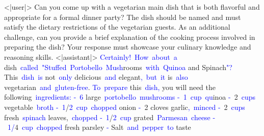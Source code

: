 \documentclass{article}
\begin{document}
\begin{tcolorbox}[colframe=black,colback=white]
<|user|>
Can you come up with a vegetarian main dish that is both flavorful and appropriate for a formal dinner party? The dish should be named and must satisfy the dietary restrictions of the vegetarian guests. As an additional challenge, can you provide a brief explanation of the cooking process involved in preparing the dish? Your response must showcase your culinary knowledge and reasoning skills.
<|assistant|>
\textcolor{blue}{Certainly}\textcolor{blue}{!}\textcolor{blue}{~How}\textcolor{blue}{~about}\textcolor{blue}{~a} dish\textcolor{blue}{~called}\textcolor{blue}{~"}\textcolor{blue}{St}\textcolor{blue}{uffed}\textcolor{blue}{~Port}\textcolor{blue}{ob}\textcolor{blue}{ello}\textcolor{blue}{~Mush}rooms\textcolor{blue}{~with}\textcolor{blue}{~Qu}\textcolor{blue}{inoa} and Spinach\textcolor{blue}{"?} This\textcolor{blue}{~dish}\textcolor{blue}{~is} not\textcolor{blue}{~only} delicious\textcolor{blue}{~and} elegant\textcolor{blue}{,}\textcolor{blue}{~but}\textcolor{blue}{~it} is\textcolor{blue}{~also} vegetarian\textcolor{blue}{~and}\textcolor{blue}{~gluten}\textcolor{blue}{-free}.
\textcolor{blue}{To}\textcolor{blue}{~prepare} this\textcolor{blue}{~dish}\textcolor{blue}{,} you will need the following\textcolor{blue}{~ingredients}\textcolor{blue}{:
}\textcolor{blue}{-}\textcolor{blue}{~}\textcolor{blue}{6} large\textcolor{blue}{~port}\textcolor{blue}{ob}\textcolor{blue}{ello}\textcolor{blue}{~mushrooms}\textcolor{blue}{
}\textcolor{blue}{-}\textcolor{blue}{~}\textcolor{blue}{1}\textcolor{blue}{~cup}\textcolor{blue}{~qu}inoa\textcolor{blue}{
}\textcolor{blue}{-}\textcolor{blue}{~}2\textcolor{blue}{~cups} vegetable\textcolor{blue}{~broth}\textcolor{blue}{
}\textcolor{blue}{-}\textcolor{blue}{~}\textcolor{blue}{1}/\textcolor{blue}{2}\textcolor{blue}{~cup}\textcolor{blue}{~chopped} onion\textcolor{blue}{
}\textcolor{blue}{-}\textcolor{blue}{~}2 cloves garlic\textcolor{blue}{,}\textcolor{blue}{~minced}\textcolor{blue}{
}\textcolor{blue}{-}\textcolor{blue}{~}2\textcolor{blue}{~cups} fresh\textcolor{blue}{~spinach} leaves,\textcolor{blue}{~chopped}\textcolor{blue}{
}\textcolor{blue}{-}\textcolor{blue}{~}\textcolor{blue}{1}/\textcolor{blue}{2}\textcolor{blue}{~cup} grated\textcolor{blue}{~Parm}\textcolor{blue}{esan}\textcolor{blue}{~cheese}\textcolor{blue}{
}\textcolor{blue}{-}\textcolor{blue}{~}\textcolor{blue}{1}\textcolor{blue}{/}4\textcolor{blue}{~cup}\textcolor{blue}{~chopped} fresh parsley\textcolor{blue}{
}\textcolor{blue}{-} Salt\textcolor{blue}{~and}\textcolor{blue}{~pepper}\textcolor{blue}{~to} taste

\end{tcolorbox}
\end{document}
